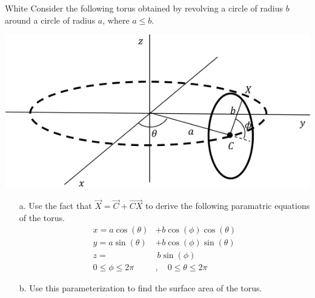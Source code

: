 \documentclass[titlepage]{article}
\begin{document}
\fancyhf{}
\cfoot{\thepage}
\begin{cproblem}{1}{White}
Consider the following torus obtained by revolving a circle of radius $b$ around a circle of radius $a$, where $a\leq b$. 
\begin{center}\includegraphics[scale=.6]{torus}\end{center}\phantom{.}
\vspace{-2em}
\begin{itemize}
\item[a.] Use the fact that $\vec{X} = \vec{C} + \vec{CX}$ to derive the following paramatric equations of the torus.
\begin{align*}
x = a\cos(\theta) &+ b\cos(\phi)\cos(\theta) \\ 
y = a\sin(\theta) &+ b \cos(\phi)\sin(\theta) \\
z =&\ b\sin(\phi) \\
0\leq \phi \leq 2\pi&, \quad 0\leq\theta\leq 2\pi
\end{align*}
\vspace{-2em}
\item[b.] Use this parameterization to find the surface area of the torus.
\end{itemize}
\end{cproblem}
\end{document}

